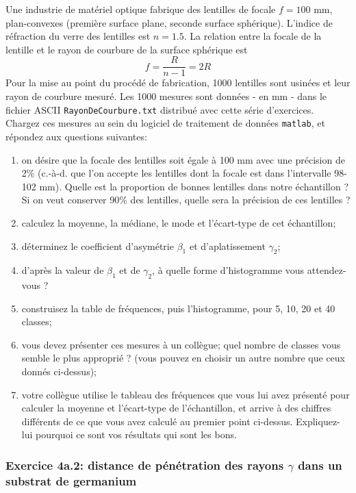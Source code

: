 \documentclass[main.tex]{subfiles}
\begin{document}
Une industrie de matériel optique fabrique des lentilles de focale $f=100$ mm, plan-convexes (première surface plane, seconde surface sphérique). L'indice de réfraction du verre des lentilles est $n=1.5$. La relation entre la focale de la lentille et le rayon de courbure de la surface sphérique est
$$
    f=\frac{R}{n-1}=2R
$$
Pour la mise au point du procédé de fabrication, 1000 lentilles sont usinées et leur rayon de courbure mesuré. Les 1000 mesures sont données - en mm - dans le fichier ASCII \texttt{RayonDeCourbure.txt} distribué avec cette série d'exercices. Chargez ces mesures au sein du logiciel de traitement de données \texttt{matlab}, et répondez aux questions suivantes:
\begin{enumerate}
    \item on désire que la focale des lentilles soit égale à 100 mm avec une précision de 2\% (c.-à-d. que l'on accepte les lentilles dont la focale est dans l'intervalle 98-102 mm). Quelle est la proportion de bonnes lentilles dans notre échantillon ? Si on veut conserver 90\% des lentilles, quelle sera la précision de ces lentilles ?
    \item calculez la moyenne, la médiane, le mode et l'écart-type de cet échantillon;
    \item déterminez le coefficient d'asymétrie $\beta_1$ et d'aplatissement $\gamma_2$;
    \item d'après la valeur de $\beta_1$ et de $\gamma_2$, à quelle forme d'histogramme vous attendez-vous ?
    \item construisez la table de fréquences, puis l'histogramme, pour 5, 10, 20 et 40 classes;
    \item vous devez présenter ces mesures à un collègue; quel nombre de classes vous semble le plus approprié ? (vous pouvez en choisir un autre nombre que ceux donnés ci-dessus);
    \item votre collègue utilise le tableau des fréquences que vous lui avez présenté pour calculer la moyenne et l'écart-type de l'échantillon, et arrive à des chiffres différents de ce que vous avez calculé au premier point ci-dessus. Expliquez-lui pourquoi ce sont vos résultats qui sont les bons.
\end{enumerate}

\subsubsection{Exercice 4a.2: distance de pénétration des rayons $\gamma$ dans un substrat de germanium}
\end{document}
